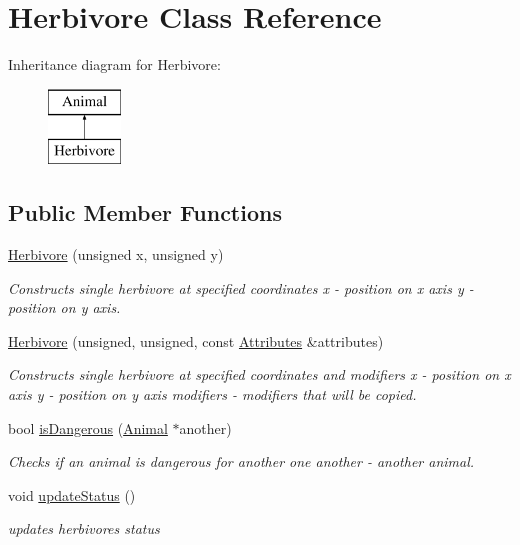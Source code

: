 \hypertarget{class_herbivore}{}\section{Herbivore Class Reference}
\label{class_herbivore}
Inheritance diagram for Herbivore\+:\begin{figure}[H]
\begin{center}
\leavevmode
\includegraphics[height=2.000000cm]{class_herbivore}
\end{center}
\end{figure}
\subsection*{Public Member Functions}
\begin{DoxyCompactItemize}
\item 
\hyperlink{class_herbivore_a7fd69ef4659c97df525a04e54d5194be}{Herbivore} (unsigned x, unsigned y)
\begin{DoxyCompactList}\small\item\em Constructs single herbivore at specified coordinates  x -\/ position on x axis  y -\/ position on y axis. \end{DoxyCompactList}\item 
\hyperlink{class_herbivore_a2ff8de430287eda378edad800f9ec730}{Herbivore} (unsigned, unsigned, const \hyperlink{class_attributes}{Attributes} \&attributes)
\begin{DoxyCompactList}\small\item\em Constructs single herbivore at specified coordinates and modifiers  x -\/ position on x axis  y -\/ position on y axis  modifiers -\/ modifiers that will be copied. \end{DoxyCompactList}\item 
bool \hyperlink{class_herbivore_a330a480982c71b393d90a95ae9e7f513}{is\+Dangerous} (\hyperlink{class_animal}{Animal} $\ast$another)
\begin{DoxyCompactList}\small\item\em Checks if an animal is dangerous for another one  another -\/ another animal. \end{DoxyCompactList}\item 
void \hyperlink{class_herbivore_ab85ced8d71235be1cb475e01e097ba55}{update\+Status} ()
\begin{DoxyCompactList}\small\item\em updates herbivore\textquotesingle{}s status \end{DoxyCompactList}\end{DoxyCompactItemize}
